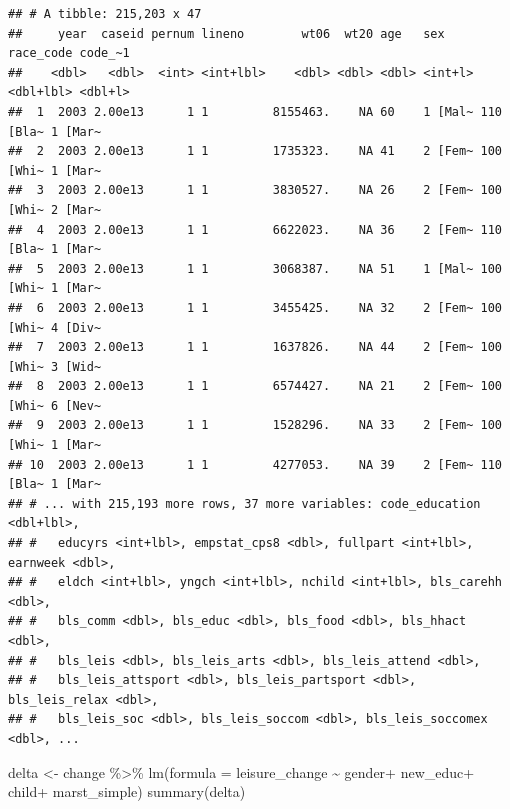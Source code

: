 \documentclass[
]{article}
\newenvironment{Shaded}{\begin{snugshade}}{\end{snugshade}}
\newcommand{\AttributeTok}[1]{\textcolor[rgb]{0.77,0.63,0.00}{#1}}
\newcommand{\FunctionTok}[1]{\textcolor[rgb]{0.00,0.00,0.00}{#1}}
\newcommand{\NormalTok}[1]{#1}
\newcommand{\OtherTok}[1]{\textcolor[rgb]{0.56,0.35,0.01}{#1}}
\newcommand{\SpecialCharTok}[1]{\textcolor[rgb]{0.00,0.00,0.00}{#1}}
\begin{document}
\begin{verbatim}
## # A tibble: 215,203 x 47
##     year  caseid pernum lineno        wt06  wt20 age   sex     race_code code_~1
##    <dbl>   <dbl>  <int> <int+lbl>    <dbl> <dbl> <dbl> <int+l> <dbl+lbl> <dbl+l>
##  1  2003 2.00e13      1 1         8155463.    NA 60    1 [Mal~ 110 [Bla~ 1 [Mar~
##  2  2003 2.00e13      1 1         1735323.    NA 41    2 [Fem~ 100 [Whi~ 1 [Mar~
##  3  2003 2.00e13      1 1         3830527.    NA 26    2 [Fem~ 100 [Whi~ 2 [Mar~
##  4  2003 2.00e13      1 1         6622023.    NA 36    2 [Fem~ 110 [Bla~ 1 [Mar~
##  5  2003 2.00e13      1 1         3068387.    NA 51    1 [Mal~ 100 [Whi~ 1 [Mar~
##  6  2003 2.00e13      1 1         3455425.    NA 32    2 [Fem~ 100 [Whi~ 4 [Div~
##  7  2003 2.00e13      1 1         1637826.    NA 44    2 [Fem~ 100 [Whi~ 3 [Wid~
##  8  2003 2.00e13      1 1         6574427.    NA 21    2 [Fem~ 100 [Whi~ 6 [Nev~
##  9  2003 2.00e13      1 1         1528296.    NA 33    2 [Fem~ 100 [Whi~ 1 [Mar~
## 10  2003 2.00e13      1 1         4277053.    NA 39    2 [Fem~ 110 [Bla~ 1 [Mar~
## # ... with 215,193 more rows, 37 more variables: code_education <dbl+lbl>,
## #   educyrs <int+lbl>, empstat_cps8 <dbl>, fullpart <int+lbl>, earnweek <dbl>,
## #   eldch <int+lbl>, yngch <int+lbl>, nchild <int+lbl>, bls_carehh <dbl>,
## #   bls_comm <dbl>, bls_educ <dbl>, bls_food <dbl>, bls_hhact <dbl>,
## #   bls_leis <dbl>, bls_leis_arts <dbl>, bls_leis_attend <dbl>,
## #   bls_leis_attsport <dbl>, bls_leis_partsport <dbl>, bls_leis_relax <dbl>,
## #   bls_leis_soc <dbl>, bls_leis_soccom <dbl>, bls_leis_soccomex <dbl>, ...
\end{verbatim}

\begin{Shaded}
\begin{Highlighting}[]
\NormalTok{delta }\OtherTok{\textless{}{-}}\NormalTok{ change }\SpecialCharTok{\%\textgreater{}\%}
  \FunctionTok{lm}\NormalTok{(}\AttributeTok{formula =}\NormalTok{ leisure\_change }\SpecialCharTok{\textasciitilde{}}\NormalTok{ gender}\SpecialCharTok{+}\NormalTok{ new\_educ}\SpecialCharTok{+}\NormalTok{ child}\SpecialCharTok{+}\NormalTok{ marst\_simple)}
\FunctionTok{summary}\NormalTok{(delta)}
\end{Highlighting}
\end{Shaded}
\end{document}
